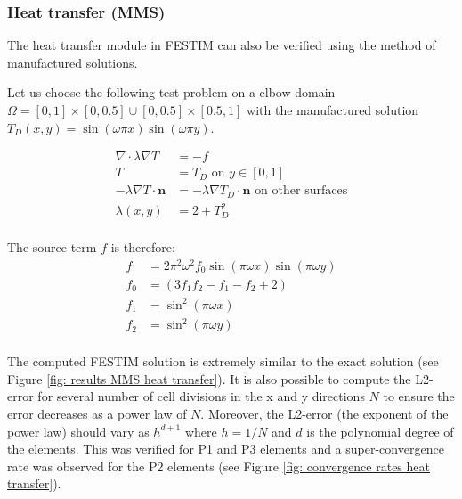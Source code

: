 \subsubsection{Heat transfer (MMS)}


The heat transfer module in FESTIM can also be verified using the method of manufactured solutions.

Let us choose the following test problem on a elbow domain $\Omega = [0, 1] \times [0, 0.5] \cup [0, 0.5] \times [0.5, 1]$ with the manufactured solution $T_D(x, y) = \sin(\omega \pi x) \sin(\omega \pi y)$.

\begin{align}
    \nabla \cdot \lambda \nabla T &= -f \\
    T &= T_D \text{  on  } y \in [0, 1] \\
    -\lambda \nabla T \cdot \mathbf{n} &= -\lambda \nabla T_D \cdot \mathbf{n} \text{  on  other surfaces} \\
    \lambda(x, y) &= 2 + T_D^2 \\
\end{align}

The source term $f$ is therefore:
\begin{align}
    f &= 2 \pi^{2} \omega^{2} f_0 \sin{\left (\pi \omega x \right )} \sin{\left (\pi \omega y \right )} \\
    f_0 &= \left(3 f_1 f_2 - f_1 - f_2 + 2\right) \\
    f_1 &= \sin^{2}{\left (\pi \omega x \right )} \\
    f_2 &= \sin^{2}{\left (\pi \omega y \right )} \\
\end{align}

The computed FESTIM solution is extremely similar to the exact solution (see Figure \ref{fig: results MMS heat transfer}).
It is also possible to compute the L2-error for several number of cell divisions in the x and y directions $N$ to ensure the error decreases as a power law of $N$.
Moreover, the L2-error (the exponent of the power law) should vary as $h^{d+1}$ where $h=1/N$ and $d$ is the polynomial degree of the elements.
This was verified for P1 and P3 elements and a super-convergence rate was observed for the P2 elements (see Figure \ref{fig: convergence rates heat transfer}).

